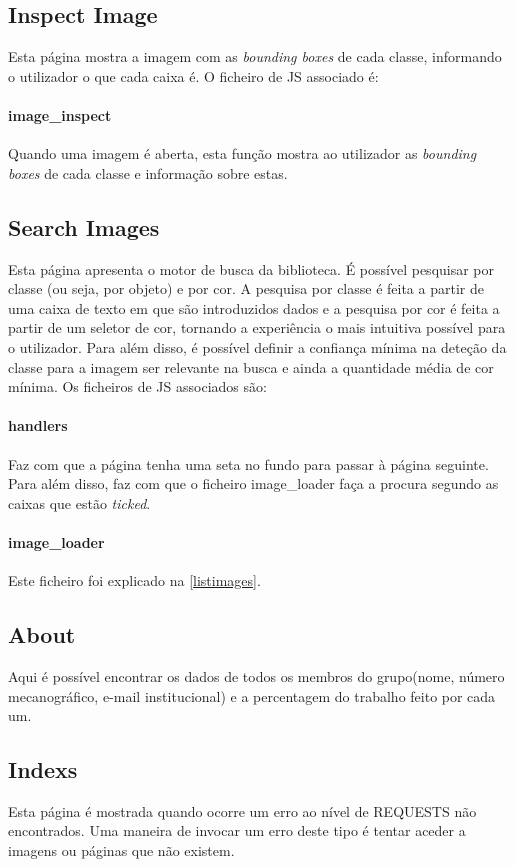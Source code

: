 \documentclass{report}
\begin{document}
\subsection{Inspect Image}
Esta página mostra a imagem  com as \textit{bounding boxes} de cada classe, informando o utilizador o que cada caixa é. O ficheiro de \ac{JS} associado é:
\paragraph{image\_inspect}
Quando uma imagem é aberta, esta função mostra ao utilizador as \textit{bounding boxes} de cada classe e informação sobre estas. 


\subsection{Search Images}
Esta página apresenta o motor de busca da biblioteca. É possível pesquisar por classe (ou seja, por objeto) e por cor. A pesquisa por classe é feita a partir de uma caixa de texto em que são introduzidos dados e a pesquisa por cor é feita a partir de um seletor de cor, tornando a experiência o mais intuitiva possível para o utilizador. Para além disso, é possível definir a confiança mínima na deteção da classe para a imagem ser relevante na busca e ainda a quantidade média de cor mínima. Os ficheiros de \ac{JS} associados são:
\paragraph{handlers}
Faz com que a página tenha uma seta no fundo para passar à página seguinte. Para além disso, faz com que o ficheiro image\_loader faça a procura segundo as caixas que estão \textit{ticked}.
\paragraph{image\_loader}
Este ficheiro foi explicado na \autoref{listimages}.

\subsection{About}
Aqui é possível encontrar os dados de todos os membros do grupo(nome, número mecanográfico, e-mail institucional) e a percentagem do trabalho feito por cada um.

\subsection{Indexs}
Esta página é mostrada quando ocorre um erro ao nível de REQUESTS não encontrados. Uma maneira de invocar um erro deste tipo é tentar aceder a imagens ou páginas que não existem. 
\end{document}
